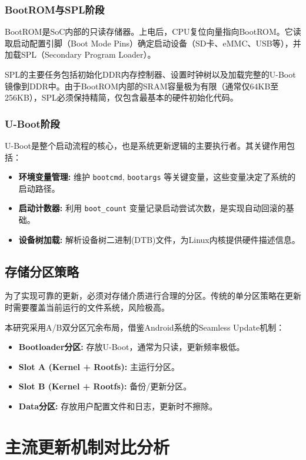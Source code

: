 \documentclass[a4paper,12pt]{article}
\begin{document}
\subsubsection{BootROM与SPL阶段}
BootROM是SoC内部的只读存储器。上电后，CPU复位向量指向BootROM。它读取启动配置引脚（Boot Mode Pins）确定启动设备（SD卡、eMMC、USB等），并加载SPL（Secondary Program Loader）。

SPL的主要任务包括初始化DDR内存控制器、设置时钟树以及加载完整的U-Boot镜像到DDR中。由于BootROM内部的SRAM容量极为有限（通常仅64KB至256KB），SPL必须保持精简，仅包含最基本的硬件初始化代码。

\subsubsection{U-Boot阶段}
U-Boot是整个启动流程的核心，也是系统更新逻辑的主要执行者。其关键作用包括：
\begin{itemize}
    \item \textbf{环境变量管理:} 维护 \texttt{bootcmd}, \texttt{bootargs} 等关键变量，这些变量决定了系统的启动路径。
    \item \textbf{启动计数器:} 利用 \texttt{boot\_count} 变量记录启动尝试次数，是实现自动回滚的基础。
    \item \textbf{设备树加载:} 解析设备树二进制(DTB)文件，为Linux内核提供硬件描述信息。
\end{itemize}

\subsection{存储分区策略}
为了实现可靠的更新，必须对存储介质进行合理的分区。传统的单分区策略在更新时需要覆盖当前运行的文件系统，风险极高。

本研究采用A/B双分区冗余布局，借鉴Android系统的Seamless Update机制：
\begin{itemize}
    \item \textbf{Bootloader分区:} 存放U-Boot，通常为只读，更新频率极低。
    \item \textbf{Slot A (Kernel + Rootfs):} 主运行分区。
    \item \textbf{Slot B (Kernel + Rootfs):} 备份/更新分区。
    \item \textbf{Data分区:} 存放用户配置文件和日志，更新时不擦除。
\end{itemize}

\newpage
\section{主流更新机制对比分析}
\end{document}
